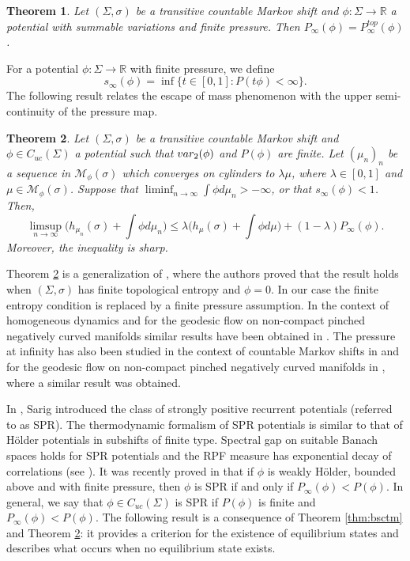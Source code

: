 \documentclass[letterpaper,11pt]{amsart}
\theoremstyle{plain}
\newtheorem{theorem}{Theorem}[section]
\theoremstyle{plain}
\theoremstyle{definition}
\theoremstyle{remark}
\def\R{{\mathbb R}}
\def\M{{\mathcal M}}
\begin{document}
\begin{theorem}\label{varpriplus} Let $(\Sigma,\sigma)$ be a transitive countable Markov shift and $\phi:\Sigma\to\R$ a potential with summable variations and finite pressure. Then $P_\infty(\phi)=P^{top}_\infty(\phi)$. 
\end{theorem}

For a potential $\phi:\Sigma\to\R$ with finite pressure, we define $$s_\infty(\phi)=\inf\{t\in [0,1]:P(t\phi)<\infty\}.$$ The following result relates the escape of mass phenomenon with the upper semi-continuity of the pressure map.

\begin{theorem} \label{thm:1}  Let $(\Sigma,\sigma)$ be a transitive countable Markov shift and $\phi\in C_{uc}(\Sigma)$ a potential such that $\emph{var}_2(\phi)$ and $P(\phi)$ are finite.  Let $(\mu_n)_n$ be a sequence  in $\M_\phi(\sigma)$ which converges on cylinders to $\lambda\mu$, where $\lambda\in [0,1]$ and $\mu\in\M_\phi(\sigma)$. Suppose that $\liminf_{n\to\infty}\int \phi  d\mu_n>-\infty$, or that $s_\infty(\phi)<1$. Then,
$$\limsup_{n\to\infty}\bigg(h_{\mu_n}(\sigma)+\int \phi d\mu_n\bigg)\le \lambda\bigg(h_\mu(\sigma)+\int \phi d\mu\bigg)+(1-\lambda)P_\infty(\phi).$$
Moreover, the inequality is sharp.
\end{theorem}

Theorem \ref{thm:1} is a generalization of  \cite[Theorem 1.1]{itv}, where the authors proved that the result holds when $(\Sigma,\sigma)$ has finite topological entropy and $\phi=0$. In our case  the finite entropy condition is replaced by a finite pressure assumption.  In the context of homogeneous dynamics and for the geodesic flow on non-compact  pinched negatively curved manifolds similar results  have been obtained in \cite{elmv, ek, ekp,rv,ve, gst}. The pressure at infinity has also been studied in the context of countable Markov shifts in \cite{rs} and for the geodesic flow on non-compact pinched negatively curved manifolds in \cite{gst}, where a similar result was obtained. 

In \cite{sa2}, Sarig introduced the class of strongly positive recurrent potentials (referred to as SPR). The thermodynamic formalism of SPR potentials is similar to that of H\"older potentials in subshifts of finite type. Spectral gap on suitable Banach spaces holds for SPR potentials and the RPF measure has exponential decay of correlations (see \cite{sa2, cs}). It was recently proved in \cite{rs} that if $\phi$ is weakly H\"older, bounded above and with finite pressure,  then $\phi$ is SPR if and only if $P_\infty(\phi)<P(\phi)$. In general, we say that $\phi\in C_{uc}(\Sigma)$  is SPR if $P(\phi)$ is finite and $P_\infty(\phi)<P(\phi)$. The following result is a consequence of Theorem \ref{thm:bsctm} and Theorem \ref{thm:1}: it provides a criterion for the existence of equilibrium states and describes what occurs when no equilibrium state exists.
 
\end{document}
